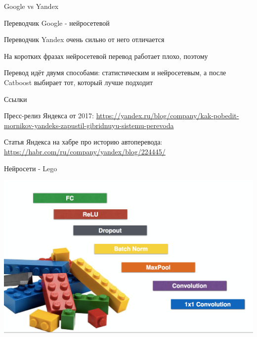 \documentclass[notes,12pt, aspectratio=169]{beamer}
\newenvironment{wideitemize}{\itemize\addtolength{\itemsep}{10pt}}{\enditemize}
\begin{document}
\begin{frame} {Google vs Yandex} 
\begin{wideitemize}
	\item  Переводчик Google - нейросетевой 
	\item  Переводчик Yandex очень сильно от него отличается
	\item  На коротких фразах нейросетевой перевод работает плохо, поэтому 
	\item  Перевод идёт двумя способами: статистическим и нейросетевым, а после Catboost выбирает тот, который лучше подходит 
\end{wideitemize}
\end{frame}


\begin{frame} {Ссылки} 
\begin{wideitemize}
	\item  Пресс-релиз Яндекса от 2017: {\color{blue} \url{https://yandex.ru/blog/company/kak-pobedit-mornikov-yandeks-zapustil-gibridnuyu-sistemu-perevoda}}
	\item  	Статья Яндекса на хабре про историю автоперевода: {\color{blue} \url{https://habr.com/ru/company/yandex/blog/224445/}}
\end{wideitemize}
\end{frame}


\begin{frame}{Нейросети - Lego}
\begin{center}
	\includegraphics[width=.9\linewidth]{lego.png}
\end{center}
\end{frame}
\end{document}
